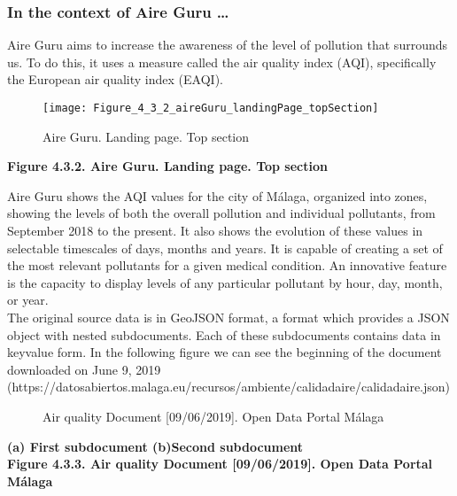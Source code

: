 \subsubsection*{In the context of Aire Guru \ldots} 

Aire Guru aims to increase the awareness of the level of pollution that surrounds us.
To do this, it uses a measure called the air quality index (AQI), specifically the European air quality index (EAQI).

\begin{figure}[ht]
    \centering
    \texttt{[image: Figure\_4\_3\_2\_aireGuru\_landingPage\_topSection]}
    \caption{Aire Guru. Landing page. Top section}
\end{figure}
\begin{center}
    \bf{        
    Figure 4.3.2. Aire Guru. Landing page. Top section}
\end{center}

Aire Guru shows the AQI values for the city of Málaga, organized into zones, showing the levels of both the overall pollution and individual pollutants, from September 2018 to the present.
It also shows the evolution of these values in selectable timescales of days, months and years.
It is capable of creating a set of the most relevant pollutants for a given medical condition.
An innovative feature is the capacity to display levels of any particular pollutant by hour, day, month, or year. \\

The original source data is in GeoJSON format, a format which provides a JSON object with nested subdocuments.
Each of these subdocuments contains data in key\-value form.
In the following figure we can see the beginning of the document downloaded on June 9, 2019 (https://datosabiertos.malaga.eu/recursos/ambiente/calidadaire/calidadaire.json) \\

\begin{figure}[ht]
    \centering
    \hfill
    \caption{Air quality Document [09/06/2019]. Open Data Portal Málaga}
\end{figure}
    
\begin{center}
    \bf{        (a) First subdocument (b)Second subdocument \\
    Figure 4.3.3. Air quality Document [09/06/2019]. Open Data Portal Málaga}
\end{center}

